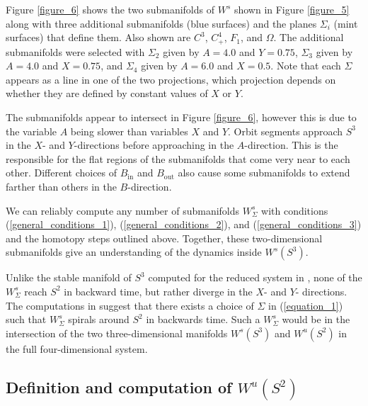 \documentclass{ws-ijbc}
\begin{document}
Figure \ref{figure_6} shows the two submanifolds of $W^{s}$ shown in Figure \ref{figure_5} along with three additional submanifolds (blue surfaces) and the planes $\Sigma_i$ (mint surfaces) that define them.  Also shown are $C^3$, $C^4_+$, $F_1$, and $\Omega$.  The additional submanifolds were selected with $\Sigma_2$ given by $A=4.0$ and $Y=0.75$, $\Sigma_3$ given by $A=4.0$ and $X=0.75$, and $\Sigma_4$ given by $A=6.0$ and $X=0.5$.  Note that each $\Sigma$ appears as a line in one of the two projections, which projection depends on whether they are defined by constant values of $X$ or $Y$.  

The submanifolds appear to intersect in Figure \ref{figure_6}, however this is due to the variable $A$ being slower than variables $X$ and $Y$.  Orbit segments approach $S^3$ in the $X$- and $Y$-directions before approaching in the $A$-direction.  This is the responsible for the flat regions of the submanifolds that come very near to each other.  Different choices of $B_{\text{in}}$ and $B_{\text{out}}$ also cause some submanifolds to extend farther than others in the $B$-direction.

We can reliably compute any number of submanifolds $W^s_\Sigma$ with conditions (\ref{general_conditions_1}),  (\ref{general_conditions_2}), and (\ref{general_conditions_3}) and the homotopy steps outlined above.  Together, these two-dimensional submanifolds give an understanding of the dynamics inside $W^s(S^3)$.
    
Unlike the stable manifold of $S^3$ computed for the reduced system in \cite{QSSA}, none of the $W^{s}_{\Sigma}$ reach $S^2$ in backward time, but rather diverge in the $X$- and $Y$- directions.  The computations in \cite{QSSA} suggest that there exists a choice of $\Sigma$ in (\ref{equation_1}) such that $W^s_{\Sigma}$ spirals around $S^2$ in backwards time.  Such a $W^s_{\Sigma}$ would be in the intersection of the two three-dimensional manifolds $W^s(S^3)$ and $W^u(S^2)$ in the full four-dimensional system.  

\subsection{Definition and computation of $W^{u}(S^2)$}  
\end{document}
